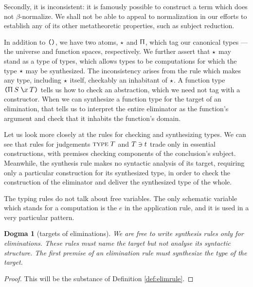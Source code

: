 \documentclass{jfp1}
\newtheorem{dogma}[theorem]{Dogma}
\newcommand{\Pa}[1]{\texttt{(}#1\texttt{)}}
\begin{document}
Secondly, it is inconsistent: it is famously possible to construct a term
which does not $\beta$-normalize. We shall not be able to appeal to normalization
in our efforts to establish any of its other metatheoretic properties, such as
subject reduction.

In addition to $\Pa$, we have two atoms, $\star$ and $\Uppi$, which tag our canonical
types --- the universe and function spaces, respectively. We further assert that
$\star$ may stand as a type of types, which allows types to be computations for which
the type $\star$ may be synthesized. The inconsistency arises from the rule which
makes any type, including $\star$ itself, checkably an inhabitant of $\star$. A
function type $\PI SxT$ tells us how to check an abstraction, which we need not
tag with a constructor. When we can synthesize a function type for the target
of an elimination, that tells us to interpret the entire eliminator as the function's
argument and check that it inhabits the function's domain.

Let us look more closely at the rules for checking and synthesizing types. We can see that
rules for judgements $\textsc{type}\;T$ and $T \ni t$ trade only in essential constructions,
with premises checking components of the conclusion's subject. Meanwhile, the synthesis
rule makes no syntactic analysis of its target, requiring only a particular construction
for its synthesized type, in order to check the construction of the eliminator
and deliver the synthesized type of the whole.

The typing rules do not talk about free variables. The only schematic variable
which stands for a computation is the $e$ in the application rule, and it is used in a
very particular pattern.

\begin{dogma}[targets of eliminations]
  We are free to write synthesis rules only for eliminations. These rules must
  name the target but not analyse its syntactic structure. The first premise
  of an elimination rule must synthesize the type of the target.
\end{dogma}
\begin{proof}
  This will be the substance of Definition \ref{def:elimrule}.
\end{proof}
\end{document}
